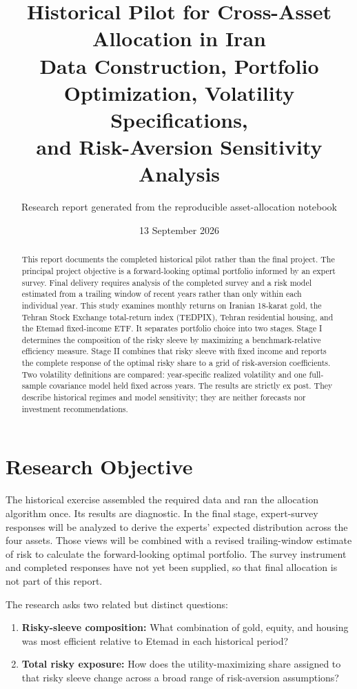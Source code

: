 \documentclass[11pt,a4paper]{article}
\title{\textbf{Historical Pilot for Cross-Asset Allocation in Iran}\\
\large Data Construction, Portfolio Optimization, Volatility Specifications,\\
and Risk-Aversion Sensitivity Analysis}
\author{Research report generated from the reproducible asset-allocation notebook}
\date{13 September 2026}
\begin{document}
\maketitle

\begin{abstract}
This report documents the completed historical pilot rather than the final project. The principal
project objective is a forward-looking optimal portfolio informed by an expert survey. Final
delivery requires analysis of the completed survey and a risk model estimated from a trailing
window of recent years rather than only within each individual year.
This study examines monthly returns on Iranian 18-karat gold, the Tehran Stock Exchange
total-return index (TEDPIX), Tehran residential housing, and the Etemad fixed-income ETF.
It separates portfolio choice into two stages. Stage I determines the composition of the risky
sleeve by maximizing a benchmark-relative efficiency measure. Stage II combines that risky
sleeve with fixed income and reports the complete response of the optimal risky share to a grid
of risk-aversion coefficients. Two volatility definitions are compared: year-specific realized
volatility and one full-sample covariance model held fixed across years. The results are strictly
ex post. They describe historical regimes and model sensitivity; they are neither forecasts nor
investment recommendations.
\end{abstract}

\tableofcontents
\newpage

\section{Research Objective}

The historical exercise assembled the required data and ran the allocation algorithm once. Its
results are diagnostic. In the final stage, expert-survey responses will be analyzed to derive the
experts' expected distribution across the four assets. Those views will be combined with a revised
trailing-window estimate of risk to calculate the forward-looking optimal portfolio. The survey
instrument and completed responses have not yet been supplied, so that final allocation is not part
of this report.

The research asks two related but distinct questions:

\begin{enumerate}
  \item \textbf{Risky-sleeve composition:} What combination of gold, equity, and housing was
  most efficient relative to Etemad in each historical period?
  \item \textbf{Total risky exposure:} How does the utility-maximizing share assigned to that
  risky sleeve change across a broad range of risk-aversion assumptions?
\end{enumerate}
\end{document}
